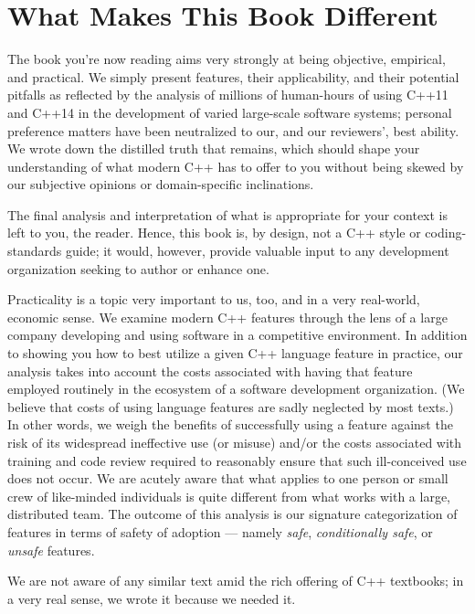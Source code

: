 \section{What Makes This Book Different}

The book you're now reading aims very strongly at being objective, empirical, and practical. We simply present features, their applicability, and their potential pitfalls as reflected by the analysis of millions of human-hours of using C++11 and C++14 in the development of varied large-scale software systems; personal preference matters have been neutralized to our, and our reviewers', best ability. We wrote down the distilled truth that remains, which should shape your understanding of what modern C++ has to offer to you without being skewed by our subjective opinions or domain-specific inclinations.

The final analysis and interpretation of what is appropriate for your context is left to you, the reader. Hence, this book is, by design, not a C++ style or coding-standards guide; it would, however, provide valuable input to any development organization seeking to author or enhance one.

Practicality is a topic very important to us, too, and in a very real-world, economic sense. We examine modern C++ features through the lens of a large company developing and using software in a competitive environment. In addition to showing you how to best utilize a given C++ language feature in practice, our analysis takes into account the costs associated with having that feature employed routinely in the ecosystem of a software development organization. (We believe that costs of using language features are sadly neglected by most texts.) In other words, we weigh the benefits of successfully using a feature against the risk of its widespread ineffective use (or misuse) and/or the costs associated with training and code review required to reasonably ensure that such ill-conceived use does not occur. We are acutely aware that what applies to one person or small crew of like-minded individuals is quite different from what works with a large, distributed team. The outcome of this analysis is our signature categorization of features in terms of safety of adoption --- namely \textit{safe}, \textit{conditionally safe}, or \textit{unsafe} features.

We are not aware of any similar text amid the rich offering of C++ textbooks; in a very real sense, we wrote it because we needed it.

